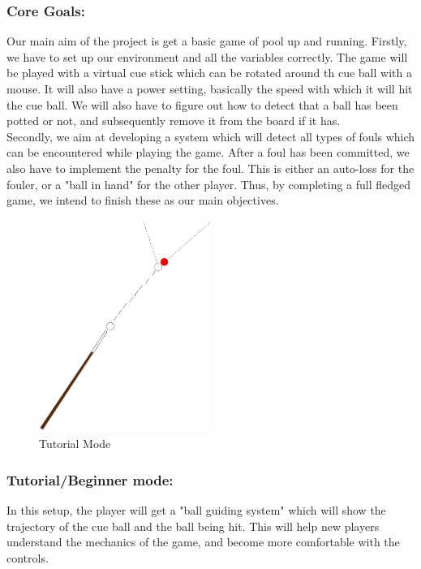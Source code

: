 \documentclass[a4paper,12pt]{article}
\begin{document}
\subsubsection{Core Goals:}
Our main aim of the project is get a basic game of pool up and running. Firstly, we have to set up our environment and all the variables correctly. The game will be played with a virtual cue stick which can be rotated around th cue ball with a mouse. It will also have a power setting, basically the speed with which it will hit the cue ball. We will also have to figure out how to detect that a ball has been potted or not, and subsequently remove it from the board if it has.\\

Secondly, we aim at developing a system which will detect all types of fouls which can be encountered while playing the game. After a foul has been committed, we also have to implement the penalty for the foul. This is either an auto-loss for the fouler, or a "ball in hand" for the other player. Thus, by completing a full fledged game, we intend to finish these as our main objectives.
\clearpage


\begin{figure}
  \begin{center}
    \includegraphics[width=0.5\textwidth]{tut.jpg}
  \end{center}
  \vspace{-20pt}
  \caption{Tutorial Mode}
  \vspace{-140pt}
\end{figure}

\subsubsection{Tutorial/Beginner mode:}
In this setup, the player will get a "ball guiding system" which will show the trajectory of the cue ball and the ball being hit. This will help new players understand the mechanics of the game, and become more comfortable with the controls.
\end{document}
